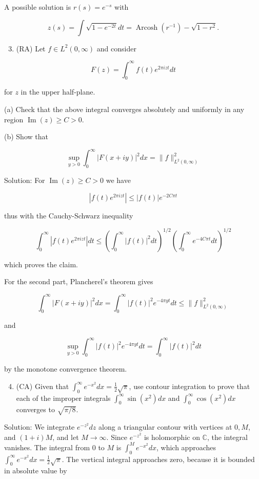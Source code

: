 \documentclass[10pt]{article}
\begin{document}
A possible solution is $r(s)=e^{-s}$ with

$$
z(s)=\int \sqrt{1-e^{-2 t}} d t=\operatorname{Arcosh}\left(r^{-1}\right)-\sqrt{1-r^{2}} .
$$

\begin{enumerate}
  \setcounter{enumi}{2}
  \item (RA) Let $f \in L^{2}(0, \infty)$ and consider
\end{enumerate}

$$
F(z)=\int_{0}^{\infty} f(t) e^{2 \pi i z t} d t
$$

for $z$ in the upper half-plane.

(a) Check that the above integral converges absolutely and uniformly in any region $\operatorname{Im}(z) \geq C>0$.

(b) Show that

$$
\sup _{y>0} \int_{0}^{\infty}|F(x+i y)|^{2} d x=\|f\|_{L^{2}(0, \infty)}^{2}
$$

Solution: For $\operatorname{Im}(z) \geq C>0$ we have

$$
\left|f(t) e^{2 \pi i z t}\right| \leq|f(t)| e^{-2 C \pi t}
$$

thus with the Cauchy-Schwarz inequality

$$
\int_{0}^{\infty}\left|f(t) e^{2 \pi i z t}\right| d t \leq\left(\int_{0}^{\infty}|f(t)|^{2} d t\right)^{1 / 2}\left(\int_{0}^{\infty} e^{-4 C \pi t} d t\right)^{1 / 2}
$$

which proves the claim.

For the second part, Plancherel's theorem gives

$$
\int_{0}^{\infty}|F(x+i y)|^{2} d x=\int_{0}^{\infty}|f(t)|^{2} e^{-4 \pi y t} d t \leq\|f\|_{L^{2}(0, \infty)}^{2}
$$

and

$$
\sup _{y>0} \int_{0}^{\infty}|f(t)|^{2} e^{-4 \pi y t} d t=\int_{0}^{\infty}|f(t)|^{2} d t
$$

by the monotone convergence theorem.

\begin{enumerate}
  \setcounter{enumi}{3}
  \item (CA) Given that $\int_{0}^{\infty} e^{-x^{2}} d x=\frac{1}{2} \sqrt{\pi}$, use contour integration to prove that each of the improper integrals $\int_{0}^{\infty} \sin \left(x^{2}\right) d x$ and $\int_{0}^{\infty} \cos \left(x^{2}\right) d x$ converges to $\sqrt{\pi / 8}$.
\end{enumerate}

Solution: We integrate $e^{-z^{2}} d z$ along a triangular contour with vertices at $0, M$, and $(1+i) M$, and let $M \rightarrow \infty$. Since $e^{-z^{2}}$ is holomorphic on $\mathbb{C}$, the integral vanishes. The integral from 0 to $M$ is $\int_{0}^{M} e^{-x^{2}} d x$, which approaches $\int_{0}^{\infty} e^{-x^{2}} d x=\frac{1}{2} \sqrt{\pi}$. The vertical integral approaches zero, because it is bounded in absolute value by
\end{document}
